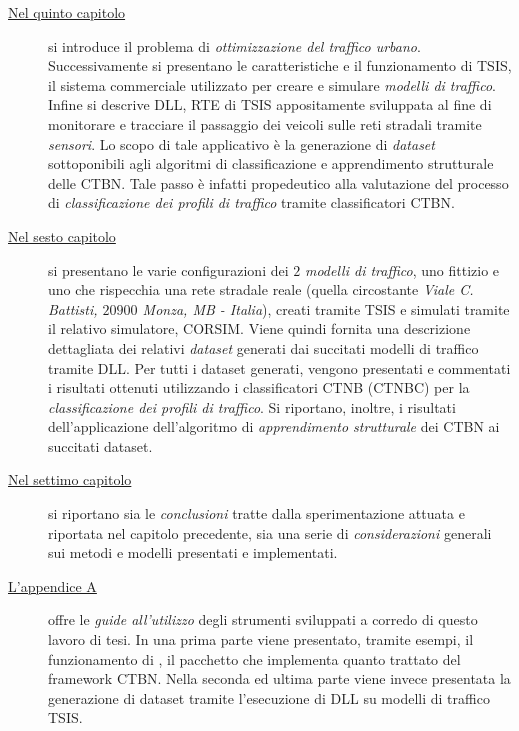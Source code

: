 \begin{description}
	\item[{\hyperref[cap:tsis-sensors]{Nel quinto capitolo}}]
	si introduce il problema di \emph{ottimizzazione del traffico urbano}. Successivamente si presentano le caratteristiche e il funzionamento di \acf{TSIS}, il sistema commerciale utilizzato per creare e simulare \emph{modelli di traffico}. Infine si descrive  \acs{DLL}, \acl{RTE} di \acs{TSIS} appositamente sviluppata al fine di monitorare e tracciare il passaggio dei veicoli sulle reti stradali tramite \emph{sensori}. Lo scopo di tale applicativo è la generazione di \emph{dataset} sottoponibili agli algoritmi di classificazione e apprendimento strutturale delle \acs{CTBN}. Tale passo è infatti propedeutico alla valutazione del processo di \emph{classificazione dei profili di traffico} tramite classificatori \acs{CTBN}.
	\item[{\hyperref[cap:esperimenti]{Nel sesto capitolo}}]
	si presentano le varie configurazioni dei $2$ \emph{modelli di traffico}, uno fittizio e uno che rispecchia una rete stradale reale (quella circostante \emph{Viale C. Battisti, $20900$ Monza, MB - Italia}), creati tramite \acs{TSIS} e simulati tramite il relativo simulatore, \acs{CORSIM}. Viene quindi fornita una descrizione dettagliata dei relativi \emph{dataset} generati dai succitati modelli di traffico tramite  \acs{DLL}. Per tutti i dataset generati, vengono presentati e commentati i risultati ottenuti utilizzando i classificatori \acs{CTNB} (\acs{CTNBC}) per la \emph{classificazione dei profili di traffico}. Si riportano, inoltre, i risultati dell'applicazione dell'algoritmo di \emph{apprendimento strutturale} dei \acs{CTBN} ai succitati dataset.
	\item[{\hyperref[cap:concl]{Nel settimo capitolo}}]
	si riportano sia le \emph{conclusioni} tratte dalla sperimentazione attuata e riportata nel capitolo precedente, sia una serie di \emph{considerazioni} generali sui metodi e modelli presentati e implementati.
	\item[{\hyperref[cap:guide]{L'appendice A}}]
	offre le \emph{guide all'utilizzo} degli strumenti sviluppati a corredo di questo lavoro di tesi. In una prima parte viene presentato, tramite esempi, il funzionamento di , il pacchetto  che implementa quanto trattato del framework \acs{CTBN}. Nella seconda ed ultima parte viene invece presentata la generazione di dataset tramite l'esecuzione di  \acs{DLL} su modelli di traffico \acs{TSIS}.
\end{description}

